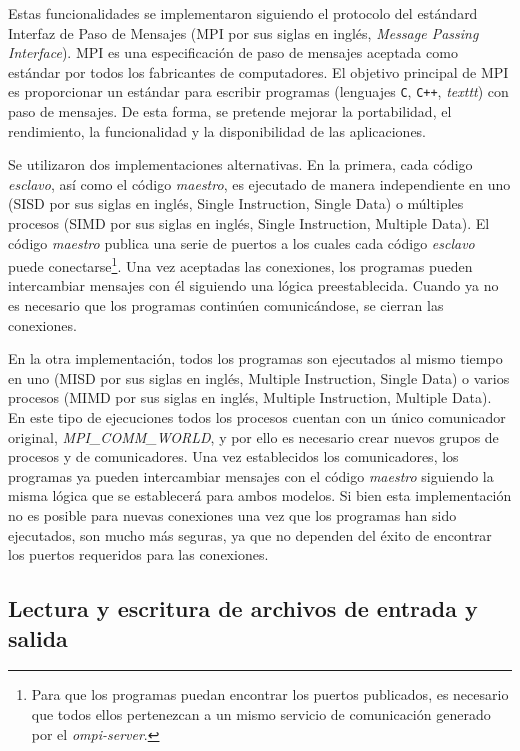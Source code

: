 Estas funcionalidades se implementaron siguiendo el protocolo del estándard Interfaz de Paso de Mensajes (MPI por sus siglas en inglés, \textit{Message Passing Interface}). 
MPI es una especificación de paso de mensajes aceptada como estándar
por todos los fabricantes de computadores. 
El objetivo principal de MPI es proporcionar un estándar para escribir
programas (lenguajes \texttt{C}, \texttt{C++}, \textit{texttt}) con paso de mensajes. De esta forma, se
pretende mejorar la portabilidad, el rendimiento, la funcionalidad y
la disponibilidad de las aplicaciones.

Se utilizaron dos implementaciones alternativas.
En la primera, cada código \textit{esclavo}, así como el código \textit{maestro},
es ejecutado de manera independiente en uno (SISD por sus siglas en inglés, Single Instruction, Single Data) o múltiples procesos (SIMD por sus siglas en inglés, Single Instruction, Multiple Data).
El código \textit{maestro} publica una serie de puertos a los cuales cada código \textit{esclavo} puede conectarse\footnote{
Para que los programas puedan encontrar los puertos publicados, es necesario que todos ellos pertenezcan a un mismo servicio de comunicación generado por el \textit{ompi-server}.
}.
Una vez aceptadas las conexiones, los programas pueden intercambiar mensajes con él siguiendo una lógica preestablecida.
Cuando ya no es necesario que los programas continúen comunicándose, se cierran las conexiones.

En la otra implementación, todos los programas son ejecutados al mismo tiempo en uno (MISD por sus siglas en inglés, Multiple Instruction, Single Data) o varios procesos (MIMD por sus siglas en inglés, Multiple Instruction, Multiple Data).
En este tipo de ejecuciones todos los procesos cuentan con un único comunicador original, \textit{MPI\_COMM\_WORLD}, y por ello es necesario crear nuevos grupos de procesos y de comunicadores.
Una vez establecidos los comunicadores, los programas ya pueden intercambiar mensajes con el código \textit{maestro} siguiendo la misma lógica que se establecerá para ambos modelos.
Si bien esta implementación no es posible para nuevas conexiones una vez que los programas han sido ejecutados,
son mucho más seguras, ya que no dependen del éxito de encontrar los puertos requeridos para las conexiones.

\subsection*{Lectura y escritura de archivos de entrada y salida}
\label{2:io}

